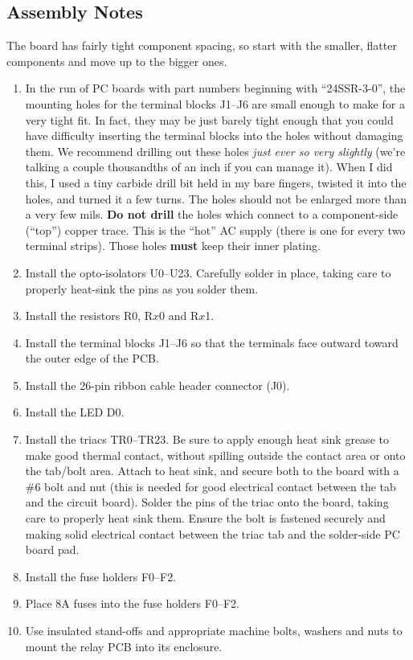 \documentclass[12pt]{article}
\begin{document}
\subsection{Assembly Notes}
The board has fairly tight component spacing, so start with the
smaller, flatter components and move up to the bigger ones.
\begin{enumerate}
\item In the run of PC boards with part numbers beginning with ``24SSR-3-0'', 
      the mounting holes for the terminal blocks J1--J6 are small enough to 
      make for a very tight fit.  In fact, they may be just barely tight enough
      that you could have difficulty inserting the terminal blocks into the holes
      without damaging them.  We recommend drilling out these holes \emph{just
      ever so very slightly} (we're talking a couple thousandths of an inch if you can
      manage it).  When I did this, I used a tiny carbide drill bit held in my bare
      fingers, twisted it into the holes, and turned it a few turns.  The holes
      should not be enlarged more than a very few mils.  {\bf Do not drill} the holes
      which connect to a component-side (``top'') copper trace.  This is the ``hot''
      AC supply (there is one for every two terminal strips).  Those holes {\bf must}
      keep their inner plating.
\item Install the opto-isolators U0--U23.  Carefully solder in place, taking
      care to properly heat-sink the pins as you solder them.
\item Install the resistors R0, R$x$0 and R$x$1.
\item Install the terminal blocks J1--J6 so that the terminals face outward
      toward the outer edge of the PCB.
\item Install the 26-pin ribbon cable header connector (J0).
\item Install the LED D0.
\item Install the triacs TR0--TR23.  
      Be sure to apply enough heat sink grease to
      make good thermal contact, without spilling outside the contact area or
      onto the tab/bolt area.  Attach to heat sink, and secure both to the 
      board with a \#6 bolt and nut
      (this is needed for good electrical contact between the tab and the
      circuit board).  Solder the pins of the triac onto the board, taking
      care to properly heat sink them.  Ensure the bolt is fastened securely
      and making solid electrical contact between the triac tab and the 
      solder-side PC board pad.
\item Install the fuse holders F0--F2.
\item Place 8A fuses into the fuse holders F0--F2.
\item Use insulated stand-offs and appropriate machine bolts, washers and
      nuts to mount the relay PCB into its enclosure.
\end{enumerate}
\end{document}
